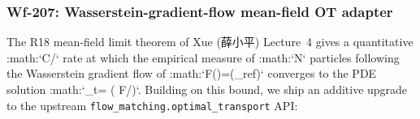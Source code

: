 %
%
%
%

\subsubsection{Wf-207: Wasserstein-gradient-flow mean-field OT adapter}
\label{sec:method:optimal-transport-v2}

The R18 mean-field limit theorem of Xue (薛小平) Lecture~4
\citep{xuexiaoping_wasserstein_gf,xue_xiaoping2026ot_gradient}
gives a quantitative :math:`C/` rate at which the empirical
measure of :math:`N` particles following the Wasserstein gradient
flow of :math:`F(\rho)=(\rho\Vert\rho_{\rm ref})`
converges to the PDE solution :math:`\partial_t\rho =
\nabla\cdot(\rho\,\nabla\,\delta F/\delta\rho)`.  Building on this
bound, we ship an additive upgrade to the upstream
\texttt{flow\_matching.optimal\_transport} API:

